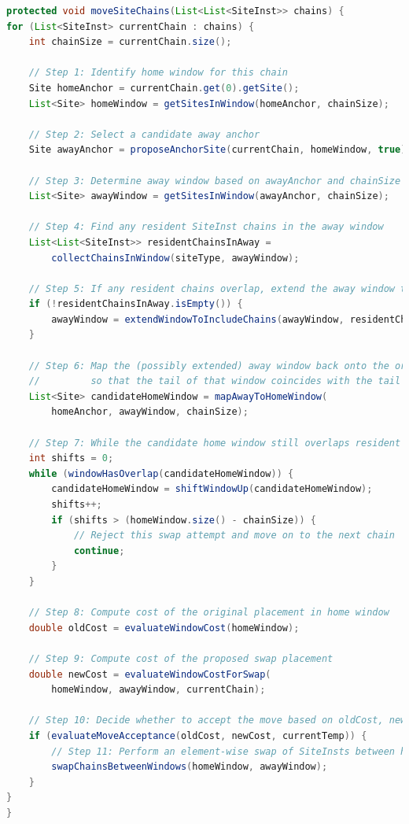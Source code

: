 \newcolumn
\begin{lstlisting}[language=Java, caption={Chain Swapping Pseudocode}, label={lst:chain_swap_pseudocode}]
protected void moveSiteChains(List<List<SiteInst>> chains) {
for (List<SiteInst> currentChain : chains) {
    int chainSize = currentChain.size();

    // Step 1: Identify home window for this chain
    Site homeAnchor = currentChain.get(0).getSite();
    List<Site> homeWindow = getSitesInWindow(homeAnchor, chainSize);

    // Step 2: Select a candidate away anchor
    Site awayAnchor = proposeAnchorSite(currentChain, homeWindow, true);

    // Step 3: Determine away window based on awayAnchor and chainSize
    List<Site> awayWindow = getSitesInWindow(awayAnchor, chainSize);

    // Step 4: Find any resident SiteInst chains in the away window
    List<List<SiteInst>> residentChainsInAway = 
        collectChainsInWindow(siteType, awayWindow);

    // Step 5: If any resident chains overlap, extend the away window to include them
    if (!residentChainsInAway.isEmpty()) {
        awayWindow = extendWindowToIncludeChains(awayWindow, residentChainsInAway);
    }

    // Step 6: Map the (possibly extended) away window back onto the original region 
    //         so that the tail of that window coincides with the tail of the current chain
    List<Site> candidateHomeWindow = mapAwayToHomeWindow(
        homeAnchor, awayWindow, chainSize);

    // Step 7: While the candidate home window still overlaps resident chains, shift upward
    int shifts = 0;
    while (windowHasOverlap(candidateHomeWindow)) {
        candidateHomeWindow = shiftWindowUp(candidateHomeWindow);
        shifts++;
        if (shifts > (homeWindow.size() - chainSize)) {
            // Reject this swap attempt and move on to the next chain
            continue;
        }
    }

    // Step 8: Compute cost of the original placement in home window
    double oldCost = evaluateWindowCost(homeWindow);

    // Step 9: Compute cost of the proposed swap placement
    double newCost = evaluateWindowCostForSwap(
        homeWindow, awayWindow, currentChain);

    // Step 10: Decide whether to accept the move based on oldCost, newCost, and temperature
    if (evaluateMoveAcceptance(oldCost, newCost, currentTemp)) {
        // Step 11: Perform an element-wise swap of SiteInsts between homeWindow and awayWindow
        swapChainsBetweenWindows(homeWindow, awayWindow);
    }
}
}
\end{lstlisting}

